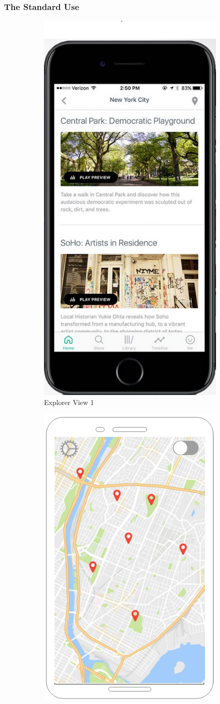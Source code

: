 \documentclass[12pt]{article}
\theoremstyle{definition}
\begin{document}
    \subsubsection{The Standard Use}
    \begin{figure}[hbt!]
        \begin{subfigure}{0.5\textwidth}
            \centering
            \includegraphics[width=0.5\linewidth]{UIs/ExplorerView1.PNG}
            \caption{Explorer View 1}
            \label{fig:ex_view_1}
        \end{subfigure}
        \begin{subfigure}{0.5\textwidth}
            \centering
            \includegraphics[width=0.6\linewidth]{UIs/MapView.png}

\end{subfigure}
\end{figure}
\end{document}
